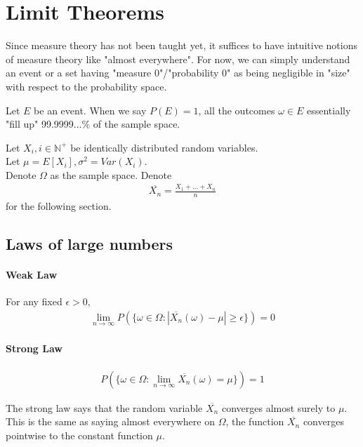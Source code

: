 \documentclass{article}
\begin{document}
\section{Limit Theorems}
Since measure theory has not been taught yet, it suffices to have intuitive notions of measure theory like "almost everywhere". For now, we can simply understand an event or a set having "measure 0"/"probability 0" as being negligible in "size" with respect to the probability space.

Let $E$ be an event. When we say $P(E)=1$, all the outcomes $\omega \in E$ essentially "fill up" 99.9999...\% of the sample space.

Let $X_i, i\in \mathbb{N}^+$ be identically distributed random variables.\\
Let $\mu = E[X_i], \sigma^2 = Var(X_i)$.\\
Denote $\Omega$ as the sample space.
Denote 
\begin{align*}
\overline{X_n} = \frac{X_1+\dots + X_n}{n}
\end{align*}
for the following section.

\subsection{Laws of large numbers}
\paragraph{Weak Law}
For any fixed $\epsilon > 0$,
\begin{align*}
	\lim_{n\rightarrow \infty}P(\{\omega \in \Omega: |\overline{X_n}(\omega)-\mu|\geq \epsilon \}) = 0
\end{align*}

\paragraph{Strong Law}
\begin{align*}
	P(\{\omega \in \Omega: \lim_{n\rightarrow \infty}\overline{X_n}(\omega) = \mu \}) = 1
\end{align*}

The strong law says that the random variable $\overline{X_n}$ converges almost surely to $\mu$. This is the same as saying almost everywhere on $\Omega$, the function $\overline{X_n}$ converges pointwise to the constant function $\mu$.
\end{document}
